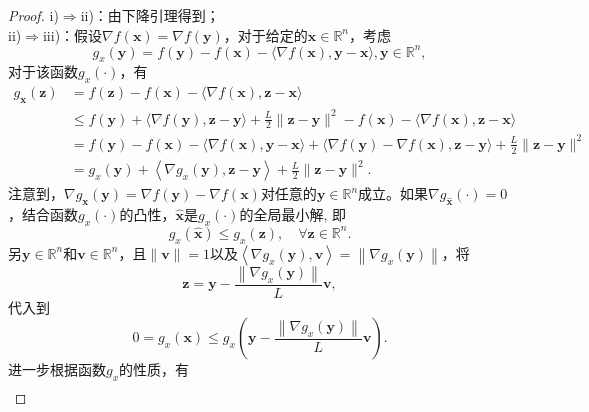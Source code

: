 \begin{proof}
    i)$  \Rightarrow  $ii)：由下降引理得到；\\
ii)$  \Rightarrow  $iii)：假设$  \nabla f(\bm{x})=\nabla f(\bm{y}) $，对于给定的$  \bm{x} \in \mathbb{R}^{n}$，考虑
\begin{equation}
g_{x}(\bm{y})=f(\bm{y})-f(\bm{x})-\langle\nabla f(\bm{x}), \bm{y}-\bm{x}\rangle, \bm{y} \in \mathbb{R}^{n},
    \nonumber
\end{equation}
对于该函数$g_{x}(\cdot)$，有
\begin{equation}
\begin{aligned}
g_{\bm{x}}(\bm{z}) &=f(\bm{z})-f(\bm{x})-\langle\nabla f(\bm{x}), \bm{z}-\bm{x}\rangle \\
& \leq f(\bm{y})+\langle\nabla f(\bm{y}), \bm{z}-\bm{y}\rangle+\frac{L}{2}\|\bm{z}-\bm{y}\|^{2}-f(\bm{x})-\langle\nabla f(\bm{x}), \bm{z}-\bm{x}\rangle \\
&=f(\bm{y})-f(\bm{x})-\langle\nabla f(\bm{x}), \bm{y}-\bm{x}\rangle+\langle\nabla f(\bm{y})-\nabla f(\bm{x}), \bm{z}-\bm{y}\rangle+\frac{L}{2}\|\bm{z}-\bm{y}\|^{2} \\
&=g_{x}(\bm{y})+\left\langle\nabla g_{x}(\bm{y}), \bm{z}-\bm{y}\right\rangle+\frac{L}{2}\|\bm{z}-\bm{y}\|^{2} .
\end{aligned}
    \nonumber
\end{equation}
注意到，$\nabla g_{\bm{x}}(\bm{y})=\nabla f(\bm{y})-\nabla f(\bm{x})  $对任意的$  \bm{y} \in \mathbb{R}^{n}  $成立。如果$  \nabla g_{\hat{\bm{x}}}(\cdot)=0 $，结合函数$g_{x}(\cdot)$的凸性，$\hat{\bm{x}}  $是$g_{x}(\cdot)$的全局最小解, 即
\begin{equation}
g_{x}(\hat{\bm{x}}) \leq g_{x}(\bm{z}), \quad \forall \bm{z} \in \mathbb{R}^{n} .
    \nonumber
\end{equation}
另$  \bm{y} \in \mathbb{R}^{n}  $和$  \bm{v} \in \mathbb{R}^{n} $，且$  \|\bm{v}\|=1  $以及$  \left\langle\nabla g_{x}(\bm{y}), \bm{v}\right\rangle=\left\|\nabla g_{x}(\bm{y})\right\|$，将
\begin{equation}
    \bm{z}=\bm{y}-\frac{\left\|\nabla g_{x}(\bm{y})\right\|}{L} \bm{v},
    \nonumber
\end{equation}
代入到
\begin{equation}
0=g_{x}(\bm{x}) \leq g_{x}\left(\bm{y}-\frac{\left\|\nabla g_{x}(\bm{y})\right\|}{L} \bm{v}\right) .
    \nonumber
\end{equation}
进一步根据函数$  g_{x}  $的性质，有
\begin{equation}
\begin{aligned}

\end{aligned}
\end{equation}
\end{proof}
